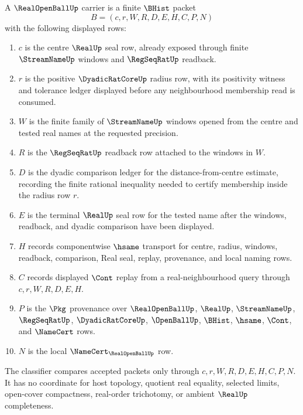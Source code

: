 \begin{definition}
\label{def:real-open-ball-carrier}
A $\RealOpenBallUp$ carrier is a finite $\BHist$ packet
$$
B=(c,r,W,R,D,E,H,C,P,N)
$$
with the following displayed rows:
\begin{enumerate}
\item $c$ is the centre $\RealUp$ seal row, already exposed through finite $\StreamNameUp$ windows and $\RegSeqRatUp$ readback.
\item $r$ is the positive $\DyadicRatCoreUp$ radius row, with its positivity witness and tolerance ledger displayed before any neighbourhood membership read is consumed.
\item $W$ is the finite family of $\StreamNameUp$ windows opened from the centre and tested real names at the requested precision.
\item $R$ is the $\RegSeqRatUp$ readback row attached to the windows in $W$.
\item $D$ is the dyadic comparison ledger for the distance-from-centre estimate, recording the finite rational inequality needed to certify membership inside the radius row $r$.
\item $E$ is the terminal $\RealUp$ seal row for the tested name after the windows, readback, and dyadic comparison have been displayed.
\item $H$ records componentwise $\hsame$ transport for centre, radius, windows, readback, comparison, Real seal, replay, provenance, and local naming rows.
\item $C$ records displayed $\Cont$ replay from a real-neighbourhood query through $c,r,W,R,D,E,H$.
\item $P$ is the $\Pkg$ provenance over $\RealOpenBallUp$, $\RealUp$, $\StreamNameUp$, $\RegSeqRatUp$, $\DyadicRatCoreUp$, $\OpenBallUp$, $\BHist$, $\hsame$, $\Cont$, and $\NameCert$ rows.
\item $N$ is the local $\NameCert_{\RealOpenBallUp}$ row.
\end{enumerate}
The classifier compares accepted packets only through $c,r,W,R,D,E,H,C,P,N$. It has no coordinate for host topology, quotient real equality, selected limits, open-cover compactness, real-order trichotomy, or ambient $\RealUp$ completeness.
\end{definition}

